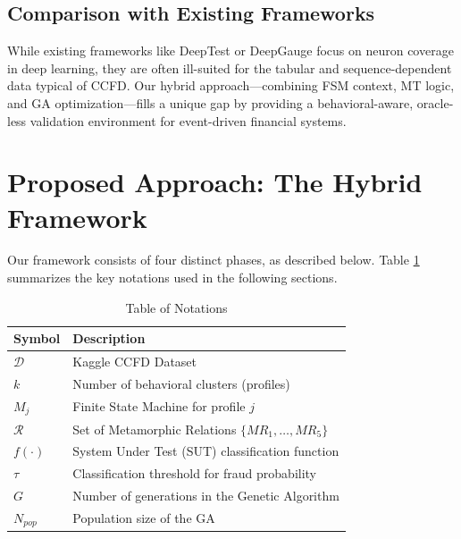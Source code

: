 \documentclass[review]{elsarticle}
\begin{document}
\subsection{Comparison with Existing Frameworks}
While existing frameworks like DeepTest or DeepGauge focus on neuron coverage in deep learning, they are often ill-suited for the tabular and sequence-dependent data typical of CCFD. Our hybrid approach—combining FSM context, MT logic, and GA optimization—fills a unique gap by providing a behavioral-aware, oracle-less validation environment for event-driven financial systems.

\section{Proposed Approach: The Hybrid Framework}
\label{sec:methodology}
Our framework consists of four distinct phases, as described below. Table \ref{tab:notation} summarizes the key notations used in the following sections.

\begin{table}[h]
\centering
\caption{Table of Notations}
\label{tab:notation}
\begin{tabular}{ll}
\toprule
Symbol & Description \\ \midrule
$\mathcal{D}$ & Kaggle CCFD Dataset \\
$k$ & Number of behavioral clusters (profiles) \\
$M_j$ & Finite State Machine for profile $j$ \\
$\mathcal{R}$ & Set of Metamorphic Relations $\{MR_1, \dots, MR_5\}$ \\
$f(\cdot)$ & System Under Test (SUT) classification function \\
$\tau$ & Classification threshold for fraud probability \\
$G$ & Number of generations in the Genetic Algorithm \\
$N_{pop}$ & Population size of the GA \\
\bottomrule
\end{tabular}
\end{table}
\end{document}
